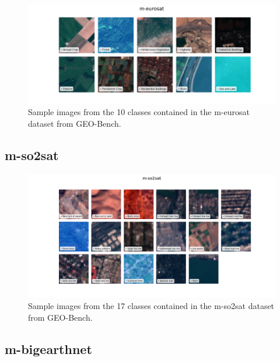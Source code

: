 \documentclass[a4paper, oneside, english]{sapthesis}
\begin{document}
\begin{figure}[h]
    \centering
    \includegraphics[width=\textwidth]{img/m-eurosat_image_grid.png}
    \caption{Sample images from the 10 classes contained in the m-eurosat dataset from GEO-Bench.}
    \label{fig:meurosatgrid}
\end{figure}


\subsection{m-so2sat}


\begin{figure}[h]
    \centering
    \includegraphics[width=\textwidth]{img/m-so2sat_image_grid.png}
    \caption{Sample images from the 17 classes contained in the m-so2sat dataset from GEO-Bench.}
    \label{fig:so2satgrid}
\end{figure}


\subsection{m-bigearthnet}
\end{document}
